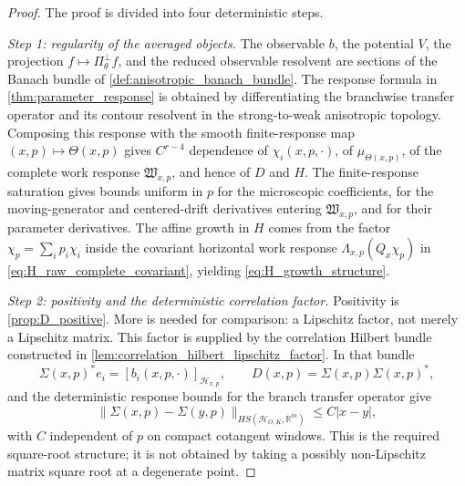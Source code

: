 \documentclass[12pt, letterpaper]{amsart}
\newcommand{\R}{\mathbb{R}}
\theoremstyle{plain}
\theoremstyle{definition}
\theoremstyle{remark}
\begin{document}
\begin{proof}
The proof is divided into four deterministic steps.

\emph{Step 1: regularity of the averaged objects.}
The observable $b$, the potential $V$, the projection
$f\mapsto\Pi^\perp_\theta f$, and the reduced observable resolvent are sections
of the Banach bundle of \cref{def:anisotropic_banach_bundle}.  The response
formula in \cref{thm:parameter_response} is obtained by differentiating the
branchwise transfer operator and its contour resolvent in the strong-to-weak
anisotropic topology.  Composing this response with the smooth finite-response
map $(x,p)\mapsto\Theta(x,p)$ gives $C^{r-4}$ dependence of
$\chi_i(x,p,\cdot)$, of $\mu_{\Theta(x,p)}$, of the complete work response
$\mathfrak W_{x,p}$, and hence of $D$ and $H$.  The finite-response saturation
gives bounds uniform in $p$ for the microscopic coefficients, for the
moving-generator and centered-drift derivatives entering $\mathfrak W_{x,p}$,
and for their parameter derivatives.  The affine growth in $H$ comes from the
factor $\chi_p=\sum_i p_i\chi_i$ inside the covariant horizontal work response
$\Lambda_{x,p}(Q_x\chi_p)$ in \eqref{eq:H_raw_complete_covariant}, yielding
\eqref{eq:H_growth_structure}.

\emph{Step 2: positivity and the deterministic correlation factor.}
Positivity is \cref{prop:D_positive}.  More is needed for comparison: a
Lipschitz factor, not merely a Lipschitz matrix.  This factor is supplied by the
correlation Hilbert bundle constructed in
\cref{lem:correlation_hilbert_lipschitz_factor}.  In that bundle
\begin{equation}
    \Sigma(x,p)^*e_i=[b_i(x,p,\cdot)]_{\mathscr H_{x,p}},
    \qquad
    D(x,p)=\Sigma(x,p)\Sigma(x,p)^* ,
\end{equation}
and the deterministic response bounds for the branch transfer operator give
\begin{equation}
\label{eq:correlation_factor_lipschitz}
    \|\Sigma(x,p)-\Sigma(y,p)\|_{HS(\mathscr H_{O,K},\R^m)}
    \le C|x-y|,
\end{equation}
with $C$ independent of $p$ on compact cotangent windows.  This is the required
square-root structure; it is not obtained by taking a possibly non-Lipschitz
matrix square root at a degenerate point.


\end{proof}
\end{document}
